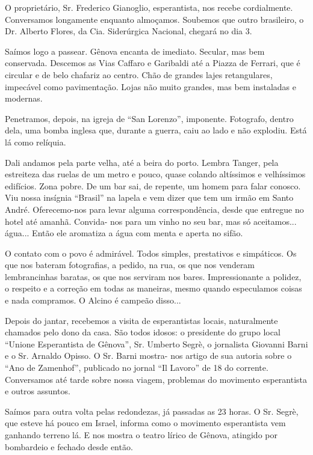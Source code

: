 O proprietário, Sr. Frederico Gianoglio, esperantista, nos recebe cordialmente. Conversamos longamente enquanto almoçamos. Soubemos que outro brasileiro, o Dr. Alberto Flores, da Cia. Siderúrgica Nacional, chegará no dia 3.

Saímos logo a passear. Gênova encanta de imediato. Secular, mas bem conservada. Descemos as Vias Caffaro e Garibaldi até a Piazza de Ferrari, que é circular e de belo chafariz ao centro. Chão de grandes lajes retangulares, impecável como pavimentação. Lojas não muito grandes, mas bem instaladas e modernas.

Penetramos, depois, na igreja de “San Lorenzo”, imponente. Fotografo, dentro dela, uma bomba inglesa que, durante a guerra, caiu ao lado e não explodiu. Está lá como relíquia.

Dali andamos pela parte velha, até a beira do porto. Lembra Tanger, pela estreiteza das ruelas de um metro e pouco, quase colando altíssimos e velhíssimos edifícios. Zona pobre. De um bar sai, de repente, um homem para falar conosco. Viu nossa insígnia “Brasil” na lapela e vem dizer que tem um irmão em Santo André. Oferecemo-nos para levar alguma correspondência, desde que entregue no hotel até amanhã. Convida- nos para um vinho no seu bar, mas só aceitamos... água... Então ele aromatiza a água com menta e aperta no sifão.

O contato com o povo é admirável. Todos simples, prestativos e simpáticos. Os que nos bateram fotografias, a pedido, na rua, os que nos venderam lembrancinhas baratas, os que nos serviram nos bares. Impressionante a polidez, o respeito e a correção em todas as maneiras, mesmo quando especulamos coisas e nada compramos. O Alcino é campeão disso...

Depois do jantar, recebemos a visita de esperantistas locais, naturalmente chamados pelo dono da casa. São todos idosos: o presidente do grupo local “Unione Esperantista de Gênova”, Sr. Umberto Segrè, o jornalista Giovanni Barni e o Sr. Arnaldo Opisso. O Sr. Barni mostra- nos artigo de sua autoria sobre o “Ano de Zamenhof”, publicado no jornal “Il Lavoro” de 18 do corrente. Conversamos até tarde sobre nossa viagem, problemas do movimento esperantista e outros assuntos.

Saímos para outra volta pelas redondezas, já passadas as 23 horas. O Sr. Segrè, que esteve há pouco em Israel, informa como o movimento esperantista vem ganhando terreno lá. E nos mostra o teatro lírico de Gênova, atingido por bombardeio e fechado desde então.

